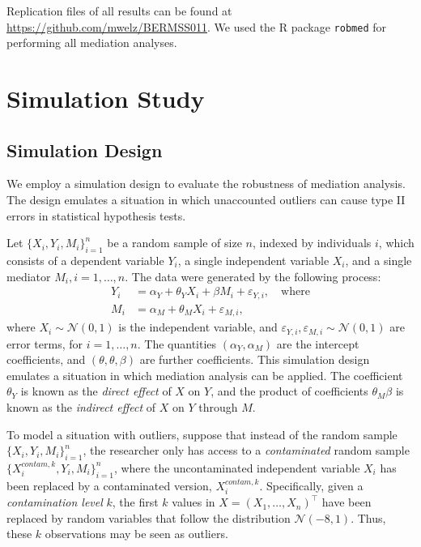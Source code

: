 \documentclass[12pt]{article}
\begin{document}
Replication files of all results can be found at \url{https://github.com/mwelz/BERMSS011}. We used the \textsf{R} package \texttt{robmed} \citep{alfons2021} for performing all mediation analyses.

\section{Simulation Study}
\subsection{Simulation Design}
We employ a simulation design to evaluate the robustness of mediation analysis. The design emulates a situation in which unaccounted outliers can cause type II errors in statistical hypothesis tests. 

Let $\{X_i, Y_i, M_i\}_{i=1}^n$ be a random sample of size $n$, indexed by individuals $i$, which consists of a dependent variable $Y_i$, a single independent variable $X_i$, and a single mediator $M_i, i=1,\dots,n$. The data were generated by the following process:
\begin{equation}
\begin{split}
    Y_i &= \alpha_Y + \theta_Y X_i + \beta M_i + \varepsilon_{Y,i}, \quad \text{where}\\
    M_i &= \alpha_M + \theta_M X_i + \varepsilon_{M,i},
\end{split}
\label{eq:simulation}
\end{equation}
where $X_i \sim \mathcal{N}(0, 1)$ is the independent variable, and $\varepsilon_{Y,i}, \varepsilon_{M,i} \sim \mathcal{N}(0, 1)$ are error terms, for $i=1,\dots,n$. The quantities $(\alpha_Y, \alpha_M)$ are the intercept coefficients, and $(\theta, \theta,\beta)$ are further coefficients. This simulation design emulates a situation in which mediation analysis can be applied. The coefficient $\theta_Y$ is known as the \textit{direct effect} of $X$ on $Y$, and the product of coefficients $\theta_M \beta$ is known as the \textit{indirect effect} of $X$ on $Y$ through $M$. 

To model a situation with outliers, suppose that instead of the random sample $\{X_i, Y_i, M_i\}_{i=1}^n$, the researcher only has access to a \textit{contaminated} random sample  $\{X_i^{contam,k}, Y_i, M_i\}_{i=1}^n$, where the uncontaminated independent variable $X_i$ has been replaced by a contaminated version, $X_i^{contam,k}$. Specifically, given a \textit{contamination level} $k$, the first $k$ values in $X = (X_1,\dots,X_n)^\top$ have been replaced by random variables that follow the distribution $\mathcal{N}(-8,1)$. Thus, these $k$ observations may be seen as outliers.
\end{document}
